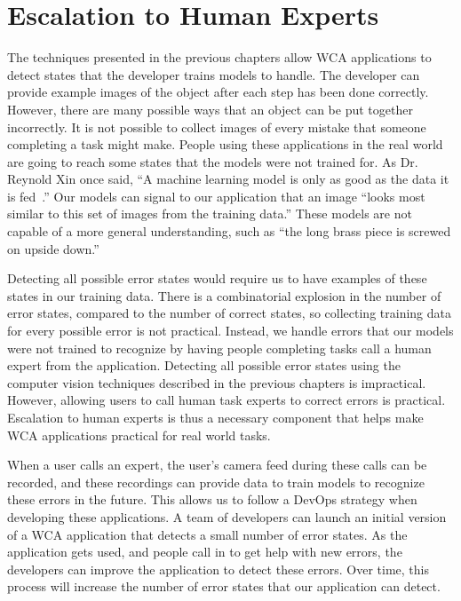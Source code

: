 \chapter{Escalation to Human Experts}\label{chap:escalation}

The techniques presented in the previous chapters allow WCA applications to
detect states that the developer trains models to handle.
The developer can provide example images of the object after each step has been
done correctly.
However, there are many possible ways that an object can be put together
incorrectly.
It is not possible to collect images of every mistake that someone completing a
task might make.
People using these
applications in the real world are going to reach some states that the models
were not trained for. As Dr. Reynold Xin once said,
``A machine learning model is only as good as the data it is fed~\cite{xin}.''
Our models can signal to our application that an image ``looks most similar to
this set of images from the training data.''
These models are not capable of a more general understanding, such as ``the long
brass piece is screwed on upside down.''

Detecting all possible error states would require us to have examples of these
states in our training data.
There is a combinatorial explosion in the number of
error states, compared to the number of correct states, so collecting training
data for every possible error is not practical.
Instead, we handle errors that our models were not trained to recognize by
having people completing tasks call a human expert from the application.
Detecting all possible error states using the computer vision techniques
described in the previous chapters is impractical.
However, allowing users to call human task experts to correct errors is
practical.
Escalation to human experts is thus a necessary component that helps make WCA
applications practical for real world tasks.

When a user calls an expert,
the user's camera feed during these calls can be recorded, and these recordings
can provide data to train models to recognize these errors in the future.
This allows us to follow a DevOps strategy when developing these applications.
A team of developers can launch an initial version of a WCA application that
detects a small number of error states.
As the application gets used, and people call in to get help with new errors,
the developers can improve the application to detect these errors.
Over time, this process will increase the number of error states that our
application can detect.

